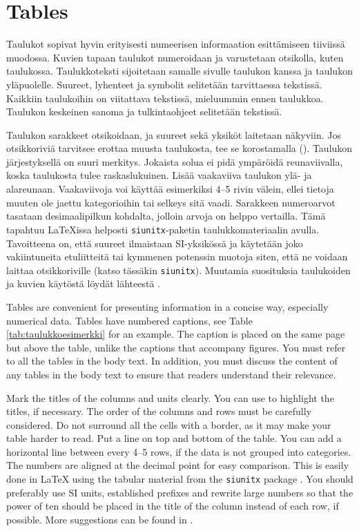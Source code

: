 \section{Tables}

Taulukot sopivat hyvin erityisesti numeerisen informaation esittämiseen tiiviissä muodossa. Kuvien tapaan taulukot numeroidaan ja varustetaan otsikolla, kuten taulukossa. Taulukkoteksti sijoitetaan samalle sivulle taulukon kanssa ja taulukon yläpuolelle. Suureet, lyhenteet ja symbolit selitetään tarvittaessa tekstissä. Kaikkiin taulukoihin on viitattava tekstissä, mieluummin ennen taulukkoa. Taulukon keskeinen sanoma ja tulkintaohjeet selitetään tekstissä.

Taulukon sarakkeet otsikoidaan, ja suureet sekä yksiköt laitetaan näkyviin. Jos otsikkoriviä tarvitsee erottaa muusta taulukosta, tee se korostamalla (). Taulukon järjestyksellä on suuri merkitys. Jokaista solua ei pidä ympäröidä reunaviivalla, koska taulukosta tulee raskaslukuinen. Lisää vaakaviiva taulukon ylä- ja alareunaan. Vaakaviivoja voi käyttää esimerkiksi 4--5 rivin välein, ellei tietoja muuten ole jaettu kategorioihin tai selkeys sitä vaadi. Sarakkeen numeroarvot tasataan desimaalipilkun kohdalta, jolloin arvoja on helppo vertailla. Tämä tapahtuu \LaTeX{}issa helposti \texttt{siunitx}-paketin  taulukkomateriaalin avulla. Tavoitteena on, että suureet ilmaistaan SI-yksikössä ja käytetään joko vakiintuneita etuliitteitä tai kymmenen potenssin muotoja siten, että ne voidaan laittaa otsikkoriville (katso tässäkin \texttt{siunitx}). Muutamia suosituksia taulukoiden ja kuvien käytöstä löydät lähteestä .

Tables are convenient for presenting information in a concise way, especially numerical data. Tables have numbered captions, see Table \ref{tab:taulukkoesimerkki} for an example. The caption is placed on the same page but above the table, unlike the captions that accompany figures. You must refer to all the tables in the body text. In addition, you must discuss the content of any tables in the body text to ensure that readers understand their relevance.

Mark the titles of the columns and units clearly. You can use  to highlight the titles, if necessary. The order of the columns and rows must be carefully considered. Do not surround all the cells with a border, as it may make your table harder to read. Put a line on top and bottom of the table. You can add a horizontal line between every 4–5 rows, if the data is not grouped into categories. The numbers are aligned at the decimal point for easy comparison. This is easily done in \LaTeX{} using the tabular material from the \texttt{siunitx} package . You should preferably use SI units, established prefixes and rewrite large numbers so that the power of ten should be placed in the title of the column instead of each row, if possible. More suggestions can be found in .

